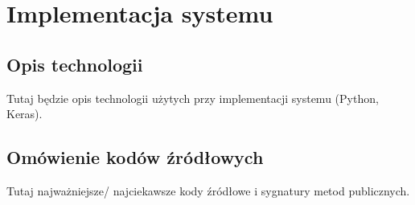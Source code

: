 \chapter{Implementacja systemu}
\thispagestyle{chapterBeginStyle}

\section{Opis technologii}
Tutaj będzie opis technologii użytych przy implementacji systemu (Python, Keras).



\section{Omówienie kodów źródłowych}
Tutaj najważniejsze/ najciekawsze kody źródłowe i sygnatury metod publicznych.


